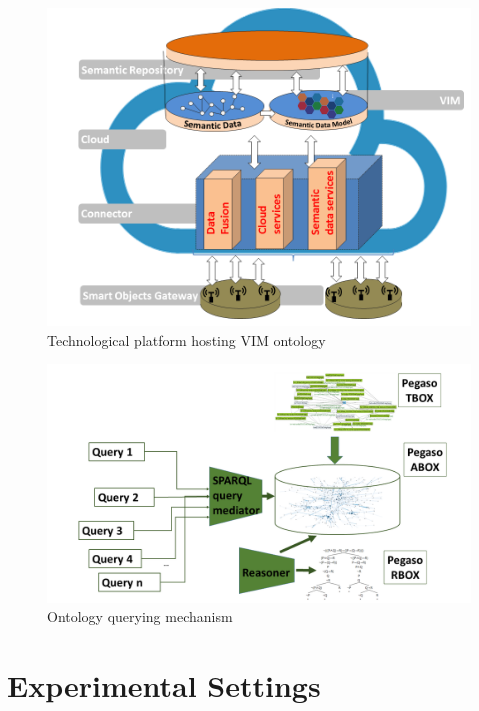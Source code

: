 \documentclass[runningheads,a4paper]{llncs}
\makeatletter
\def\maxwidth#1{\ifdim\Gin@nat@width>#1 #1\else\Gin@nat@width\fi}
\makeatother
\begin{document}
\begin{figure}[h!]
\centering
\includegraphics[width=\maxwidth{\textwidth}]{./img/image2.png}
\cprotect\caption{Technological platform hosting VIM ontology}
\label{}
\end{figure}

\begin{figure}[h!]
\centering
\includegraphics[width=\maxwidth{\textwidth}]{./img/image3.png}
\cprotect\caption{  Ontology querying mechanism}
\label{}
\end{figure}


\section{Experimental Settings}
\end{document}
